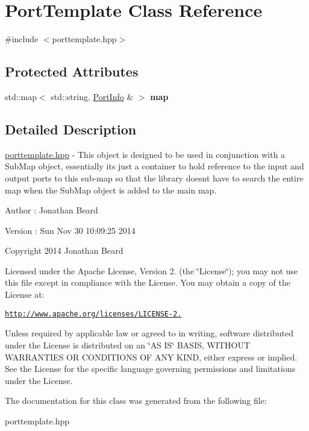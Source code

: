 \hypertarget{class_port_template}{}\section{Port\+Template Class Reference}
\label{class_port_template}


{\ttfamily \#include $<$porttemplate.\+hpp$>$}

\subsection*{Protected Attributes}
\begin{DoxyCompactItemize}
\item 
\hypertarget{class_port_template_a1930a44af30c62b60b04e22bf83cbc34}{}std\+::map$<$ std\+::string, \hyperlink{struct_port_info}{Port\+Info} \& $>$ {\bfseries map}\label{class_port_template_a1930a44af30c62b60b04e22bf83cbc34}

\end{DoxyCompactItemize}


\subsection{Detailed Description}
\hyperlink{porttemplate_8hpp_source}{porttemplate.\+hpp} -\/ This object is designed to be used in conjunction with a Sub\+Map object, essentially its just a container to hold reference to the input and output ports to this sub-\/map so that the library doesn\textquotesingle{}t have to search the entire map when the Sub\+Map object is added to the main map.

\begin{DoxyAuthor}{Author}
\+: Jonathan Beard 
\end{DoxyAuthor}
\begin{DoxyVersion}{Version}
\+: Sun Nov 30 10\+:09\+:25 2014
\end{DoxyVersion}
Copyright 2014 Jonathan Beard

Licensed under the Apache License, Version 2. (the \char`\"{}\+License\char`\"{}); you may not use this file except in compliance with the License. You may obtain a copy of the License at\+:

\href{http://www.apache.org/licenses/LICENSE-2.0}{\tt http\+://www.\+apache.\+org/licenses/\+L\+I\+C\+E\+N\+S\+E-\/2.}

Unless required by applicable law or agreed to in writing, software distributed under the License is distributed on an \char`\"{}\+A\+S I\+S\char`\"{} B\+A\+S\+I\+S, W\+I\+T\+H\+O\+U\+T W\+A\+R\+R\+A\+N\+T\+I\+E\+S O\+R C\+O\+N\+D\+I\+T\+I\+O\+N\+S O\+F A\+N\+Y K\+I\+N\+D, either express or implied. See the License for the specific language governing permissions and limitations under the License. 

The documentation for this class was generated from the following file\+:\begin{DoxyCompactItemize}
\item 
porttemplate.\+hpp\end{DoxyCompactItemize}
